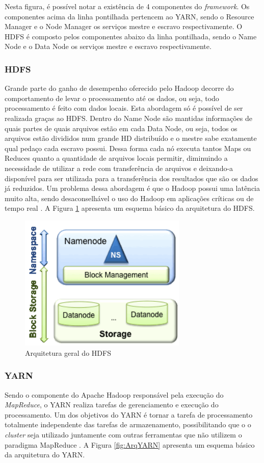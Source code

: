 Nesta figura, é possível notar a existência de 4 componentes do \textit{framework}. Os componentes acima da linha pontilhada pertencem ao YARN, sendo o Resource Manager e o Node Manager os serviços mestre e escravo respectivamente. O HDFS é composto pelos componentes abaixo da linha pontilhada, sendo o Name Node e o Data Node os serviços mestre e escravo respectivamente.

\subsubsection{HDFS}
Grande parte do ganho de desempenho oferecido pelo Hadoop decorre do comportamento de levar o processamento até os dados, ou seja, todo processamento é feito com dados locais. Esta abordagem só é possível de ser realizada graças ao HDFS. Dentro do Name Node são mantidas informações de quais partes de quais arquivos estão em cada Data Node, ou seja, todos os arquivos estão divididos num grande HD distribuído e o mestre sabe exatamente qual pedaço cada escravo possui. Dessa forma cada nó executa tantos Maps ou Reduces quanto a quantidade de arquivos locais permitir, diminuindo a necessidade de utilizar a rede com transferência de arquivos e deixando-a disponível para ser utilizada para a transferência dos resultados que são os dados já reduzidos. Um problema dessa abordagem é que o Hadoop possui uma latência muito alta, sendo desaconselhável o uso do Hadoop em aplicações críticas ou de tempo real \cite{BookHadoop}. A Figura \ref{fig:ArqHDFS} apresenta um esquema básico da arquitetura do HDFS.

\begin{figure}[!hbtn]
   \centering
   \includegraphics[width=8cm]{figuras/Figura07-HDFS.png}
   \caption{Arquitetura geral do HDFS \cite{HDFS}}
   \label{fig:ArqHDFS}
\end{figure}

\subsubsection{YARN}
Sendo o componente do Apache Hadoop responsável pela execução do \emph{MapReduce}, o YARN realiza tarefas de gerenciamento e execução do processamento. Um dos objetivos do YARN é tornar a tarefa de processamento totalmente independente das tarefas de armazenamento, possibilitando que o o \textit{cluster} seja utilizado juntamente com outras ferramentas que não utilizem o paradigma MapReduce \cite{Vavilapalli}. A Figura \ref{fig:ArqYARN} apresenta um esquema básico da arquitetura do YARN.

